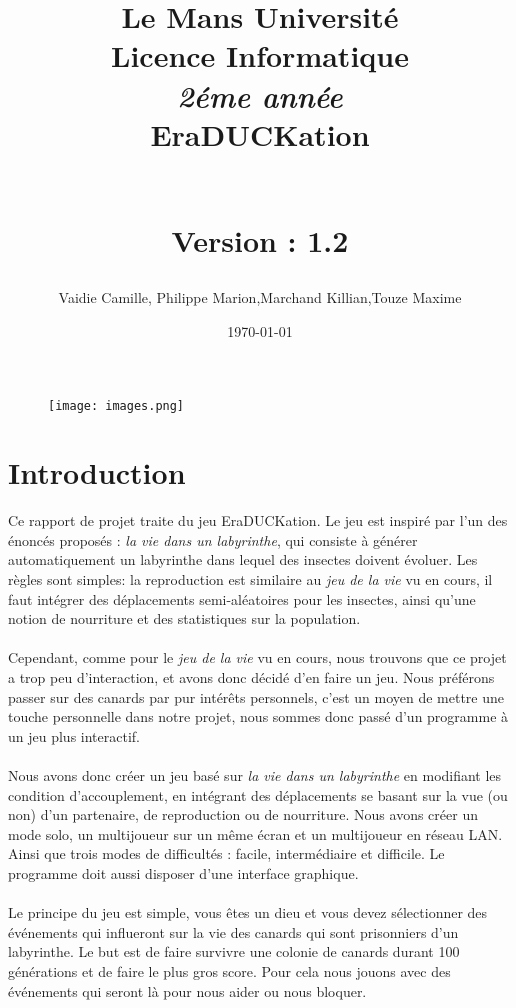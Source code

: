 ﻿\documentclass[12pt,a4paper,twoside]{article}
\begin{document}
\title {\textbf {\color {blue} Le Mans Université}\color{black}
\\Licence Informatique  
\\ \textit {2éme année}
\\ \textbf {\color {red}EraDUCKation}
\author{Vaidie Camille, Philippe Marion,Marchand Killian,Touze Maxime}
\\ Version : 1.2 
\date \today }
\maketitle 
\begin {figure}
\begin{center}\texttt{[image: images.png]} \end{center}
\hspace{100pt}
\end {figure}
\newpage
\tableofcontents
\newpage
\section{Introduction}
    Ce rapport de projet traite du jeu EraDUCKation. Le jeu est inspiré par l'un des énoncés proposés :
 \textit{la vie dans un labyrinthe}, qui consiste à générer automatiquement
 un labyrinthe dans lequel des insectes doivent évoluer. Les règles sont 
simples: la reproduction est similaire au \textit{jeu de la vie} vu en cours, il faut intégrer des déplacements semi-aléatoires pour 
les insectes, ainsi qu'une notion de nourriture et des statistiques sur 
la population.
\\
\\Cependant, comme pour le \textit{jeu de la vie} vu en cours, nous
trouvons que ce projet a trop peu d'interaction, et avons donc décidé 
d'en faire un jeu. Nous préférons passer sur des canards par pur intérêts 
personnels, c'est un moyen de mettre une touche personnelle dans notre projet, 
nous sommes donc passé d’un programme à un jeu plus interactif.
\\
\\Nous avons donc créer un jeu basé sur \textit{la vie dans un labyrinthe} en modifiant les condition d'accouplement, en intégrant des déplacements se basant sur la vue (ou non) d'un partenaire, de reproduction ou de nourriture. Nous avons créer un mode solo, un multijoueur sur un même écran et un multijoueur en réseau LAN. Ainsi que trois modes de difficultés : 
facile, intermédiaire et difficile. Le programme doit aussi disposer d'une interface graphique. \\
\\Le principe du jeu est simple, vous êtes un dieu et vous devez sélectionner des événements qui influeront sur la vie des canards qui sont prisonniers d’un labyrinthe. Le but est de faire survivre une colonie de canards durant 100 générations et de faire le plus gros score. Pour cela nous jouons avec des événements qui seront là pour nous aider ou nous bloquer.\\
\newpage
\end{document}

